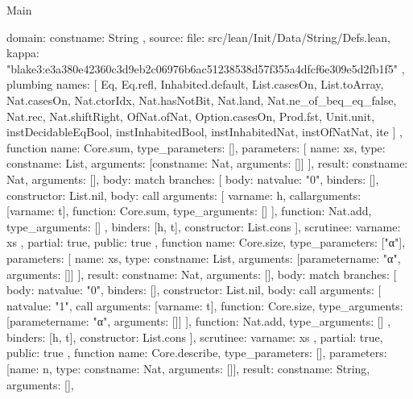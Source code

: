 \begin{lexlean}{Main}
\begin{toolingmodule}
{{{        domain: const{name: String}
      },
      source: {
        file: src/lean/Init/Data/String/Defs.lean,
        kappa: "blake3:e3a380e42360c3d9eb2c06976b6ac51238538d57f355a4dfcf6e309e5d2fb1f5"
      }
    },
    plumbing{
      names: [
        Eq,
        Eq.refl,
        Inhabited.default,
        List.casesOn,
        List.toArray,
        Nat.casesOn,
        Nat.ctorIdx,
        Nat.hasNotBit,
        Nat.land,
        Nat.ne_of_beq_eq_false,
        Nat.rec,
        Nat.shiftRight,
        OfNat.ofNat,
        Option.casesOn,
        Prod.fst,
        Unit.unit,
        instDecidableEqBool,
        instInhabitedBool,
        instInhabitedNat,
        instOfNatNat,
        ite
      ]
    },
    function{
      name: Core.sum,
      type_parameters: [],
      parameters: [
        {name: xs, type: const{name: List, arguments: [const{name: Nat, arguments: []}]}}
      ],
      result: const{name: Nat, arguments: []},
      body: match{
        branches: [
          {body: nat{value: "0"}, binders: [], constructor: List.nil},
          {
            body: call{
              arguments: [
                var{name: h},
                call{arguments: [var{name: t}], function: Core.sum, type_arguments: []}
              ],
              function: Nat.add,
              type_arguments: []
            },
            binders: [h, t],
            constructor: List.cons
          }
        ],
        scrutinee: var{name: xs}
      },
      partial: true,
      public: true
    },
    function{
      name: Core.size,
      type_parameters: ["α"],
      parameters: [
        {name: xs, type: const{name: List, arguments: [parameter{name: "α", arguments: []}]}}
      ],
      result: const{name: Nat, arguments: []},
      body: match{
        branches: [
          {body: nat{value: "0"}, binders: [], constructor: List.nil},
          {
            body: call{
              arguments: [
                nat{value: "1"},
                call{
                  arguments: [var{name: t}],
                  function: Core.size,
                  type_arguments: [parameter{name: "α", arguments: []}]
                }
              ],
              function: Nat.add,
              type_arguments: []
            },
            binders: [h, t],
            constructor: List.cons
          }
        ],
        scrutinee: var{name: xs}
      },
      partial: true,
      public: true
    },
    function{
      name: Core.describe,
      type_parameters: [],
      parameters: [{name: n, type: const{name: Nat, arguments: []}}],
      result: const{name: String, arguments: []},
}}
\end{toolingmodule}
\end{lexlean}
